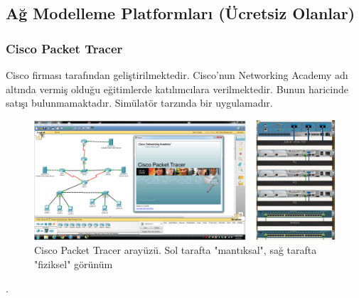 \subsection{Ağ Modelleme Platformları (Ücretsiz Olanlar)}
\subsubsection*{Cisco Packet Tracer}
Cisco firması tarafından geliştirilmektedir. Cisco'nun Networking Academy adı altında vermiş olduğu eğitimlerde katılımcılara verilmektedir. Bunun haricinde satışı bulunmamaktadır. Simülatör tarzında bir uygulamadır.

\begin{figure}[h]
    \centering
    \includegraphics[width=\textwidth]{images/CiscoPT.png}
    \caption{Cisco Packet Tracer arayüzü. Sol tarafta "mantıksal", sağ tarafta "fiziksel" görünüm}
    \label{fig:CiscoPT}
\end{figure}

.